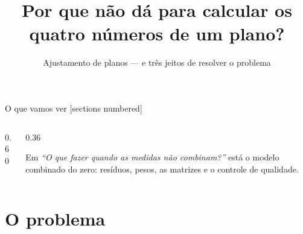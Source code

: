 \documentclass[aspectratio=169,11pt]{beamer}
\title{Por que não dá para calcular os quatro números de um plano?}
\subtitle{Ajustamento de planos --- e três jeitos de resolver o problema}
\author{}
\institute{Simulador de Ajustamento de Planos}
\date{}
\begin{document}
\maketitle

\begin{frame}{O que vamos ver}
  [sections numbered]
  \begin{columns}[T]
    \begin{column}{0.60\textwidth}
      \tableofcontents
    \end{column}
    \begin{column}{0.36\textwidth}
      \begin{ideia}[title={Esta aula tem uma anterior}]
        \small Em \emph{``O que fazer quando as medidas não combinam?''} está o modelo
        combinado do zero: resíduos, pesos, as matrizes e o controle de qualidade.
      \end{ideia}
    \end{column}
  \end{columns}
\end{frame}

\section{O problema}
\end{document}
